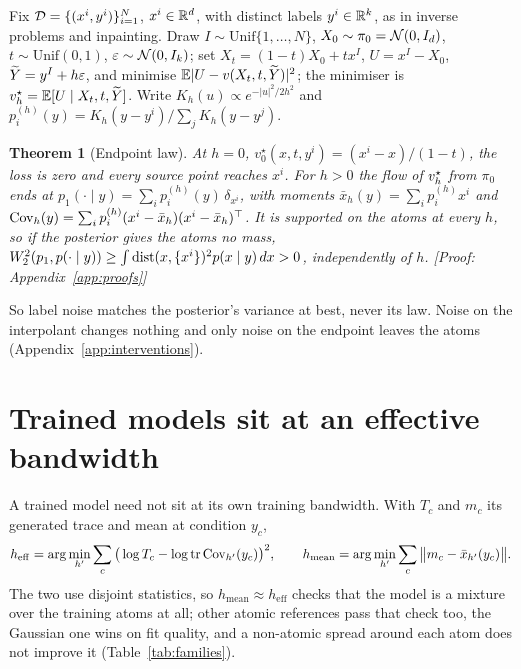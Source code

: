 \documentclass{article}
\theoremstyle{plain}
\newtheorem{theorem}{Theorem}
\theoremstyle{remark}
\renewcommand{\proofin}[1]{\hfill\textnormal{\footnotesize[Proof: Appendix~\ref{app:proofs}]}}
\begin{document}
Fix $\mathcal{D}=\{(x^i,y^i)\}_{i=1}^N$, $x^i\in\mathbb{R}^d$, with distinct labels $y^i\in\mathbb{R}^k$, as in
inverse problems and inpainting. Draw $I\sim\mathrm{Unif}\{1,\dots,N\}$,
$X_0\sim\pi_0=\mathcal{N}(0,I_d)$, $t\sim\mathrm{Unif}(0,1)$, $\varepsilon\sim\mathcal{N}(0,I_k)$; set
$X_t=(1-t)X_0+tx^I$, $U=x^I-X_0$, $\widetilde Y=y^I+h\varepsilon$, and minimise
$\mathbb{E}|U-v(X_t,t,\widetilde Y)|^2$; the minimiser is $v_h^\star=\mathbb{E}[U\mid X_t,t,\widetilde Y]$.
Write $K_h(u)\propto e^{-|u|^2/2h^2}$ and $p_i^{(h)}(y)=K_h(y-y^i)/\sum_jK_h(y-y^j)$.

\begin{theorem}[Endpoint law]
\label{thm:endpoint}
At $h=0$, $v_0^\star(x,t,y^i)=(x^i-x)/(1-t)$, the loss is zero and every source point
reaches $x^i$. For $h>0$ the flow of $v_h^\star$ from $\pi_0$ ends at
$p_1(\cdot\mid y)=\sum_ip_i^{(h)}(y)\,\delta_{x^i}$, with moments
$\bar x_h(y)=\sum_ip_i^{(h)}x^i$ and $\operatorname{Cov}_h(y)=\sum_ip_i^{(h)}(x^i-\bar x_h)(x^i-\bar
x_h)^\top$. It is supported on the atoms at every $h$, so if the posterior gives the
atoms no mass, $W_2^2(p_1,p(\cdot\mid y))\ge\int\operatorname{dist}(x,\{x^i\})^2p(x\mid y)\,dx>0$,
independently of $h$. \proofin{}
\end{theorem}

So label noise matches the posterior's variance at best, never its law. Noise on the
interpolant changes nothing and only noise on the endpoint leaves the atoms
(Appendix~\ref{app:interventions}).

\section{Trained models sit at an effective bandwidth}
\label{sec:heff}

A trained model need not sit at its own training bandwidth. With $T_c$ and $m_c$ its
generated trace and mean at condition $y_c$,
\begin{equation}
h_{\mathrm{eff}}=\arg\min_{h'}\sum_c\big(\log T_c-\log\operatorname{tr}\mathrm{Cov}_{h'}(y_c)\big)^2,
\qquad
h_{\mathrm{mean}}=\arg\min_{h'}\sum_c\big\|m_c-\bar x_{h'}(y_c)\big\|.
\label{eq:heff}
\end{equation}
The two use disjoint statistics, so $h_{\mathrm{mean}}\approx h_{\mathrm{eff}}$ checks
that the model is a mixture over the training atoms at all; other atomic references pass
that check too, the Gaussian one wins on fit quality, and a non-atomic spread around
each atom does not improve it (Table~\ref{tab:families}).
\end{document}
